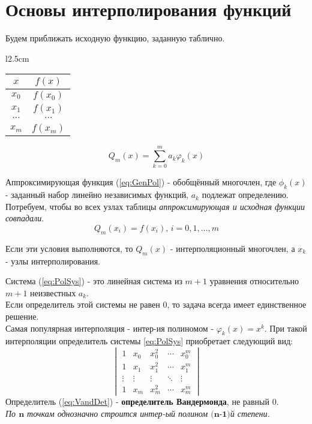\documentclass[a4paper,11pt]{article}
\begin{document}
\section{Основы интерполирования функций}
\begin{minipage}{1\linewidth}
  Будем приближать исходную функцию, заданную таблично.
  \begin{wraptable}{l}{2.5cm}
    \begin{tabular}{ c|c }
      $x$ & $f(x)$ \\
      \hline
      $x_0$ & $f(x_0)$ \\
      $x_1$ & $f(x_1)$ \\
      $\cdots$ & $\cdots$ \\
      $x_m$ & $f(x_m)$
    \end{tabular}
  \end{wraptable}
  \begin{equation}
    Q_m(x) = \sum_{k=0}^{m} a_k \varphi_k(x)
    \label{eq:GenPol}
  \end{equation}

  Аппроксимирующая функция (\ref{eq:GenPol}) - обобщённый многочлен, где ${\phi_k(x)}$ - заданный набор линейно независимых функций, $a_k$ подлежат определению. \\

  Потребуем, чтобы во всех узлах таблицы \textit{аппроксимирующая и исходная функции совпадали}.
  \begin{equation}
    Q_m(x_i) = f(x_i), \, i = 0, 1, \dots, m
    \label{eq:PolSys}
  \end{equation}
  \begin{center}
    Если эти условия выполняются, то $Q_m(x)$ - интерполяционный многочлен, а $x_k$ - узлы интерполирования.
  \end{center}
\vspace{2mm}
\end{minipage}
\newline
Система (\ref{eq:PolSys}) - это линейная система из $m+1$ уравнения относительно $m+1$ неизвестных $a_k$. \\
Если определитель этой системы не равен $0$, то задача всегда имеет единственное решение. \\
\newline
Самая популярная интерполяция - интер-ия полиномом - \(\varphi_k(x) = x^k\).
При такой интерполяции определитель системы \ref{eq:PolSys} приобретает следующий вид:
\begin{equation}
  \begin{vmatrix}
    1 & x_0 & x_0^2 & \cdots & x_0^m \\
    1 & x_1 & x_1^2 & \cdots & x_1^m \\
    \vdots & \vdots & \vdots & \ddots & \vdots \\
    1 & x_m & x_m^2 & \cdots & x_m^m
  \end{vmatrix}
  \label{eq:VandDet}
\end{equation}
Определитель (\ref{eq:VandDet}) - \textbf{определитель Вандермонда}, не равный $0$. \\

\textit{По $\textbf{n}$ точкам однозначно строится интер-ый полином $\textbf{(n-1)}$й степени.} \\
\end{document}
